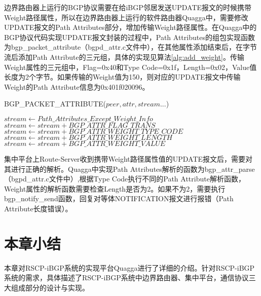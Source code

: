 边界路由器上运行的BGP协议需要在给iBGP邻居发送UPDATE报文的时候携带Weight路径属性，所以在边界路由器上运行的软件路由器Quagga中，需要修改UPDATE报文的Path Attributes部分，增加传输Weight路径属性。在Quagga中的BGP协议代码实现UPDATE报文封装的过程中，Path Attributes的组包实现函数为bgp\_packet\_attribute（bgpd\_attr.c文件中），在其他属性添加结束后，在字节流后添加Path Attribute的三元组，具体的实现见算法\ref{alg:add_weight}。传输Weight属性的三元组中，Flag=0x40和Type Code=0x1f，Length=0x02，Value值长度为2个字节。如果传输的Weight值为150，则对应的UPDATE报文中传输Weight的Path  Attribute信息为0x401f020096。

\begin{algorithm}[!h]
    \caption{BGP\_PACKET\_ATTRIBUTE($peer,attr,stream...$)}%
    \label{alg:add_weight}
    \begin{algorithmic}[1]%
        \STATE $stream \gets Path\_Attributes\_Except\_Weight\_Info$
        \STATE $stream \gets stream+BGP\_ATTR\_FLAG\_TRANS$
        \STATE $stream \gets stream+BGP\_ATTR\_WEIGHT\_TYPE\_CODE$
        \STATE $stream \gets stream+BGP\_ATTR\_WEIGHT\_LENGTH$
        \STATE $stream \gets stream+BGP\_ATTR\_WEIGHT\_VALUE$
        \ENDIF
    \end{algorithmic}
\end{algorithm}


集中平台上Route-Server收到携带Weight路径属性值的UPDATE报文后，需要对其进行正确的解析。Quagga中实现Path Attributes解析的函数为bgp\_attr\_parse（bgpd\_attr.c文件中）,根据Type Code执行不同的Path Attribute解析函数，Weight属性的解析函数需要检查Length是否为2。如果不为2，需要执行bgp\_notify\_send函数，回复对等体NOTIFICATION报文进行报错（Path Attribute长度错误）。



\section{本章小结}
本章对RSCP-iBGP系统的实现平台Quagga进行了详细的介绍。针对RSCP-iBGP系统的需求，具体描述了RSCP-iBGP系统中边界路由器、集中平台，通信协议三大组成部分的设计与实现。
